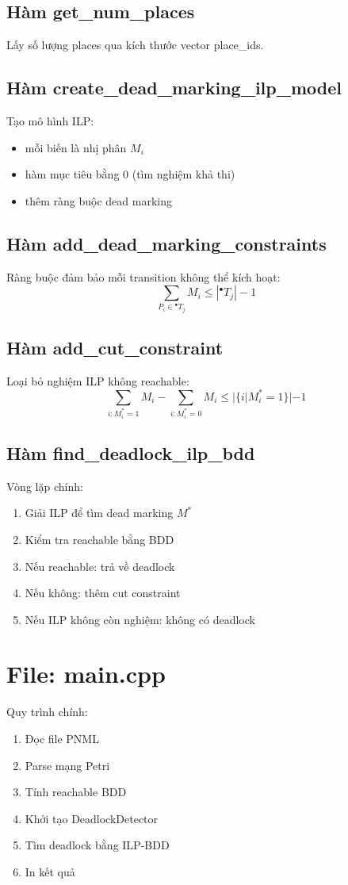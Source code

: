 \documentclass[12pt,a4paper]{article}
\begin{document}
\subsection{Hàm get\_num\_places}
Lấy số lượng places qua kích thước vector place\_ids.


\subsection{Hàm create\_dead\_marking\_ilp\_model}
Tạo mô hình ILP:
\begin{itemize}
\item mỗi biến là nhị phân $M_i$
\item hàm mục tiêu bằng 0 (tìm nghiệm khả thi)
\item thêm ràng buộc dead marking
\end{itemize}


\subsection{Hàm add\_dead\_marking\_constraints}
Ràng buộc đảm bảo mỗi transition không thể kích hoạt:
\[
\sum_{P_i \in {}^\bullet T_j} M_i \le |{}^\bullet T_j| - 1
\]


\subsection{Hàm add\_cut\_constraint}
Loại bỏ nghiệm ILP không reachable:
\[
\sum_{i: M^*_i = 1} M_i - \sum_{i: M^*_i = 0} M_i \le |\{i | M^*_i = 1\}| - 1
\]


\subsection{Hàm find\_deadlock\_ilp\_bdd}
Vòng lặp chính:
\begin{enumerate}
\item Giải ILP để tìm dead marking $M^*$
\item Kiểm tra reachable bằng BDD
\item Nếu reachable: trả về deadlock
\item Nếu không: thêm cut constraint
\item Nếu ILP không còn nghiệm: không có deadlock
\end{enumerate}


\section{File: main.cpp}
Quy trình chính:
\begin{enumerate}
\item Đọc file PNML
\item Parse mạng Petri
\item Tính reachable BDD
\item Khởi tạo DeadlockDetector
\item Tìm deadlock bằng ILP-BDD
\item In kết quả
\end{enumerate}
\end{document}
